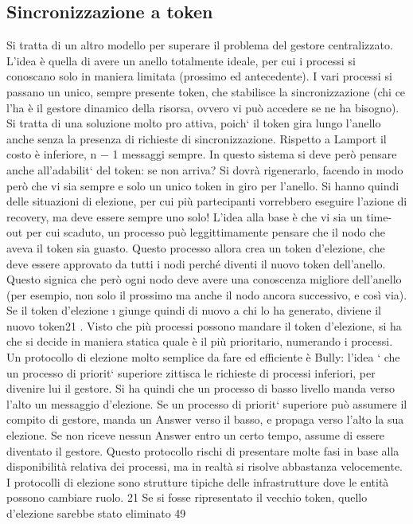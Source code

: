 \subsection{Sincronizzazione a token}
Si tratta di un altro modello per superare il problema del gestore centralizzato. L'idea è quella di avere un anello
totalmente ideale, per cui i processi si
conoscano solo in maniera limitata (prossimo ed antecedente). I vari processi
si passano un unico, sempre presente token, che stabilisce la sincronizzazione
(chi ce l'ha è il gestore dinamico della risorsa, ovvero vi può accedere se ne
ha bisogno). Si tratta di una soluzione molto pro attiva, poich` il token gira
lungo l'anello anche senza la presenza di richieste di sincronizzazione. Rispetto
a Lamport il costo è inferiore, n $-$ 1 messaggi sempre.
In questo sistema si deve però pensare anche all'adabilit` del token: se
non arriva? Si dovrà rigenerarlo, facendo in modo però che vi sia sempre e solo
un unico token in giro per l'anello. Si hanno quindi delle situazioni di elezione,
per cui più partecipanti vorrebbero eseguire l'azione di recovery, ma deve essere
sempre uno solo! L'idea alla base è che vi sia un time-out per cui scaduto, un
processo può leggittimamente pensare che il nodo che aveva il token sia guasto.
Questo processo allora crea un token d'elezione, che deve essere approvato da
tutti i nodi perché diventi il nuovo token dell'anello. Questo signica che però
ogni nodo deve avere una conoscenza migliore dell'anello (per esempio, non solo
il prossimo ma anche il nodo ancora successivo, e così via). Se il token d'elezione
\i{}
giunge quindi di nuovo a chi lo ha generato, diviene il nuovo token21 . Visto che
più processi possono mandare il token d'elezione, si ha che si decide in maniera
statica quale è il più prioritario, numerando i processi.
Un protocollo di elezione molto semplice da fare ed efficiente è Bully: l'idea
` che un processo di priorit` superiore zittisca le richieste di processi inferiori,
per divenire lui il gestore. Si ha quindi che un processo di basso livello manda
verso l'alto un messaggio d'elezione. Se un processo di priorit` superiore può
assumere il compito di gestore, manda un Answer verso il basso, e propaga verso
l'alto la sua elezione. Se non riceve nessun Answer entro un certo tempo, assume
di essere diventato il gestore. Questo protocollo rischi di presentare molte fasi
in base alla disponibilità relativa dei processi, ma in realtà si risolve abbastanza
velocemente. I protocolli di elezione sono strutture tipiche delle infrastrutture
dove le entità possono cambiare ruolo.
21 Se
si fosse ripresentato il vecchio token, quello d'elezione sarebbe stato eliminato
49
